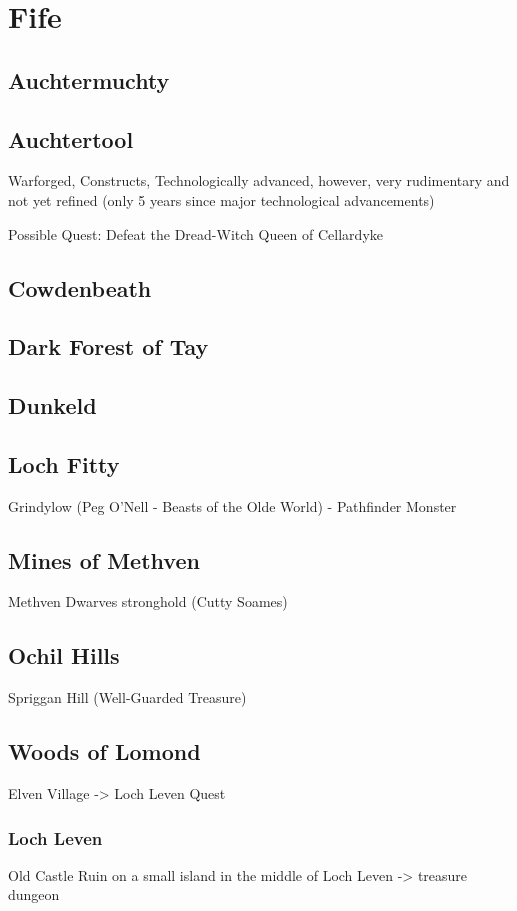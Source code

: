 \chapter*{Fife}

\section*{Auchtermuchty}
\section*{Auchtertool}
Warforged, Constructs, Technologically advanced, however, very rudimentary and not yet refined (only 5 years since major technological advancements)

Possible Quest: Defeat the Dread-Witch Queen of Cellardyke
\section*{Cowdenbeath}
\section*{Dark Forest of Tay}
\section*{Dunkeld}
\section*{Loch Fitty}
Grindylow (Peg O'Nell - Beasts of the Olde World) - Pathfinder Monster
\section*{Mines of Methven}
Methven Dwarves stronghold (Cutty Soames)
\section*{Ochil Hills}
Spriggan Hill (Well-Guarded Treasure)
\section*{Woods of Lomond}
Elven Village -> Loch Leven Quest
\subsection*{Loch Leven}%
Old Castle Ruin on a small island in the middle of Loch Leven -> treasure dungeon
